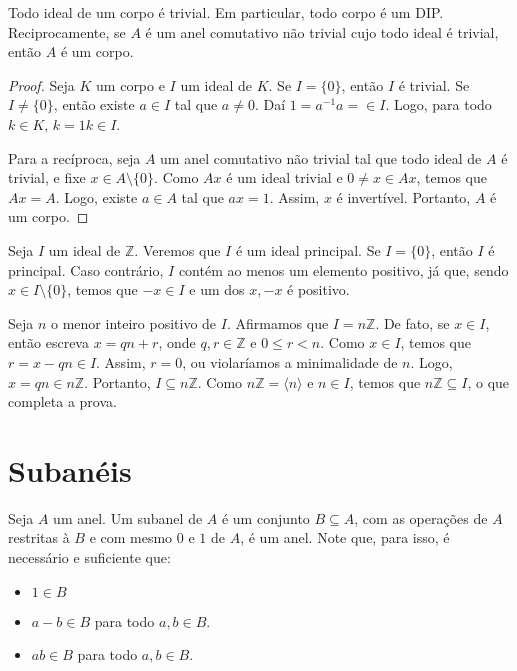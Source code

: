 \begin{prop}
    Todo ideal de um corpo é trivial. Em particular, todo corpo é um DIP. Reciprocamente, se $A$ é um anel comutativo não trivial cujo todo ideal é trivial, então $A$ é um corpo.
\end{prop}
\begin{proof}
Seja $K$ um corpo e $I$ um ideal de $K$. Se $I=\{0\}$, então $I$ é trivial. Se $I\neq \{0\}$, então existe $a \in I$ tal que $a \neq 0$. Daí $1=a^{-1}a=\in I$. Logo, para todo $k \in K$, $k=1k\in I$.

Para a recíproca, seja $A$ um anel comutativo não trivial tal que todo ideal de $A$ é trivial, e fixe $x \in A\setminus \{0\}$. Como $Ax$ é um ideal trivial e $0\neq x \in Ax$, temos que $Ax=A$. Logo, existe $a \in A$ tal que $ax=1$. Assim, $x$ é invertível. Portanto, $A$ é um corpo.
\end{proof}

\begin{prop}
    Seja $I$ um ideal de $\mathbb Z$. Veremos que $I$ é um ideal principal. Se $I=\{0\}$, então $I$ é principal. Caso contrário, $I$ contém ao menos um elemento positivo, já que, sendo $x\in I\setminus\{0\}$, temos que $-x \in I$ e um dos $x, -x$ é positivo.


    Seja $n$ o menor inteiro positivo de $I$. Afirmamos que $I=n\mathbb Z$. De fato, se $x \in I$, então escreva $x=qn+r$, onde $q,r \in \mathbb Z$ e $0\leq r<n$. Como $x \in I$, temos que $r=x-qn \in I$. Assim, $r=0$, ou violaríamos a minimalidade de $n$. Logo, $x=qn\in n\mathbb Z$. Portanto, $I\subseteq n\mathbb Z$. Como $n\mathbb Z=\langle n\rangle$ e $n \in I$, temos que $n\mathbb Z\subseteq I$, o que completa a prova.
\end{prop}
\section{Subanéis}
\begin{definition}[Subanel]
    Seja $A$ um anel. Um subanel de $A$ é um conjunto $B\subseteq A$, com as operações de $A$ restritas à $B$ e com mesmo $0$ e $1$ de $A$, é um anel. Note que, para isso, é necessário e suficiente que:
    
    \begin{itemize}
        \item $1 \in B$
        \item $a-b \in B$ para todo $a, b \in B$.
        \item $ab \in B$ para todo $a, b \in B$.
    \end{itemize}

\end{definition}
